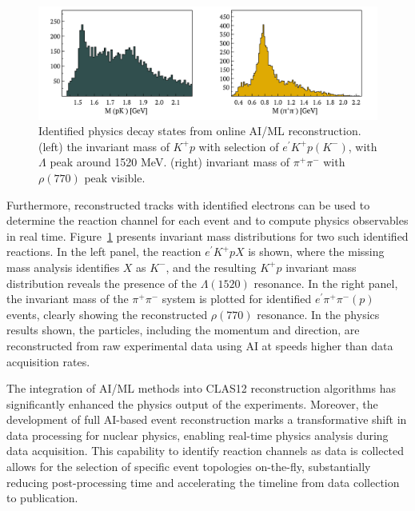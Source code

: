 \begin{figure}[h!]
\centering
\includegraphics[width=0.95\columnwidth]{images/projects/figure_lambda_instarec.pdf}
\caption{Identified physics decay states from online AI/ML reconstruction. (left) the invariant mass of $K^+p$ with selection of $e^\prime K^+p(K^-)$, with $\Lambda$ peak around 1520 MeV. (right) invariant mass of $\pi^+\pi^-$ with $\rho(770)$ peak visible. } 
\label{fig:physics}
\end{figure}

Furthermore, reconstructed tracks with identified electrons can be used to determine the reaction channel for each event and to compute physics observables in real time. Figure~\ref{fig:physics} presents invariant mass distributions for two such identified reactions. In the left panel, the reaction $e^\prime K^+p X$  is shown, where the missing mass analysis identifies $X$ as $K^-$, and the resulting $K^+p$ invariant mass distribution reveals the presence of the $\Lambda(1520)$ resonance.
In the right panel, the invariant mass of the  $\pi^+\pi^-$ system is plotted for identified $e^\prime \pi^+\pi^- (p)$ events, clearly showing the reconstructed $\rho(770)$ resonance.
In the physics results shown, the particles, including the momentum and direction, are reconstructed from raw experimental data using AI at speeds higher than data acquisition rates. 

The integration of AI/ML methods into CLAS12 reconstruction algorithms has significantly enhanced the physics output of the experiments. Moreover, the development of full AI-based event reconstruction marks a transformative shift in data processing for nuclear physics, enabling real-time physics analysis during data acquisition. This capability to identify reaction channels as data is collected allows for the selection of specific event topologies on-the-fly, substantially reducing post-processing time and accelerating the timeline from data collection to publication.



